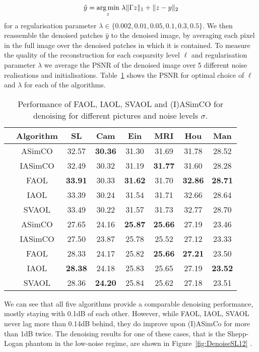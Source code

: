 \documentclass[11pt, onecolumn, journal,compsoc]{IEEEtran}
\newcommand*\rot{\rotatebox{90}}
\DeclareMathOperator*{\argmin}{\text{arg\,min}}
\theoremstyle{plain}
\theoremstyle{remark}
\begin{document}
\begin{align}
\hat y = \argmin_z\, \lambda \Vert \Gamma z\Vert_1+\Vert z-y\Vert_2
\end{align}
for a regularisation parameter $\lambda\in\{0.002,0.01, 0.05,0.1,0.3,0.5\}$.  
We then reassemble the denoised patches $\hat y$ to the denoised image, by averaging each pixel in the full image over the denoised patches in which it is contained. To measure the quality of the reconstruction for each cosparsity level $\ell$ and regularisation parameter $\lambda$ we  average the PSNR of the denoised image over 5 different noise realisations and initialisations. Table~\ref{tab:ComparisonDenoising} shows the PSNR for optimal choice of $\ell$ and $\lambda$ for each of the algorithms.
%
%
\begin{table}
	\centering
	\begin{tabular}{|c|c|c|c|c|c|c|c|}
		\hline 
		&Algorithm&SL&Cam&Ein&MRI&Hou&Man\\ 
		\hline \hline
		\multirow{ 5}{*}{\rot{$\sigma =12.8$}}&ASimCO &32.57&{\bf30.36}&31.30&31.69&31.78&28.52\\ 
		\cline{2-8} 
		&IASimCO&32.49&30.32&31.19&{\bf31.77}&31.60&28.28\\ 
		\hhline{|~|=|=|=|=|=|=|=|}
		&FAOL&{\bf 33.91}&30.33&{\bf 31.62}&31.70&{\bf 32.86}&{\bf 28.71}\\ 
		\cline{2-8}  
		&IAOL&33.39&30.24&31.54&31.71&32.66&28.64\\ 
		\cline{2-8} 
		&SVAOL&33.49&30.22&31.57&31.73&32.77&28.70\\ 
		\hline \hline
		\multirow{5}{*}{\rot{$\sigma = 45$}}&ASimCO&27.65&24.16&{\bf25.87}&{\bf25.66}&27.19&23.46\\ 
		\cline{2-8}  
		&IASimCO&27.50&23.87&25.78&25.52&27.12&23.33\\ 
		\hhline{|~|=|=|=|=|=|=|=|}
		&FAOL&28.33&24.17&25.82&{\bf25.66}&{\bf 27.21}&23.50\\ 
		\cline{2-8}  
		&IAOL&{\bf28.38}&24.18&25.83&25.65&27.19&{\bf23.52}\\ 
		\cline{2-8} 
		&SVAOL&28.36&{\bf24.20}&25.84&25.62&27.18&23.51\\ 
		\hline 
	\end{tabular} 
	\caption{Performance of FAOL, IAOL, SVAOL and (I)ASimCO for denoising for different pictures and noise levels $\sigma$. }
	\label{tab:ComparisonDenoising}
\end{table}
%
We can see that all five algorithms provide a comparable denoising performance, mostly staying with 0.1dB of each other. However, while FAOL, IAOL, SVAOL never lag more than 0.14dB behind, they do improve upon (I)ASimCo for more than 1dB twice. The denoising results for one of these cases, that is the Shepp-Logan phantom in the low-noise regime, are shown in Figure~\ref{fig:DenoiseSL12} .
\end{document}
